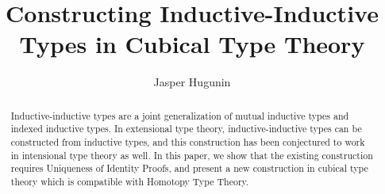 \documentclass[acmsmall,review]{acmart}\settopmatter{printfolios=true,printccs=false,printacmref=false}
\begin{document}
\title{Constructing Inductive-Inductive Types in Cubical Type Theory}

\author{Jasper Hugunin}


\begin{abstract}
Inductive-inductive types are a joint generalization of mutual inductive types and indexed inductive types. In extensional type theory, inductive-inductive types can be constructed from inductive types, and this construction has been conjectured to work in intensional type theory as well. In this paper, we show that the existing construction requires Uniqueness of Identity Proofs, and present a new construction in cubical type theory which is compatible with Homotopy Type Theory.
\end{abstract}

\maketitle
\end{document}

